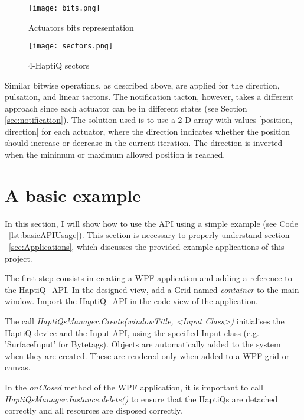 \begin{figure}[H]
  \centering
  \texttt{[image: bits.png]}
  \caption{Actuators bits representation}
  \label{fig:bits}
\end{figure}

\begin{figure}[H]
  \centering
  \texttt{[image: sectors.png]}
  \caption{4-HaptiQ sectors}
  \label{fig:sectors}
\end{figure}

Similar bitwise operations, as described above, are applied for the direction, pulsation, and linear tactons. The notification tacton, however, takes a different approach since each actuator can be in different states (see Section \ref{sec:notification}). The solution used is to use a 2-D array with values [position, direction] for each actuator, where the direction indicates whether the position should increase or decrease in the current iteration. The direction is inverted when the minimum or maximum allowed position is reached.  

\section{A basic example}

In this section, I will show how to use the API using a simple example (see Code ~\ref{lst:basicAPIUsage}). This section is necessary to properly understand section ~\ref{sec:Applications}, which discusses the provided example applications of this project.

The first step consists in creating a WPF application and adding a reference to the HaptiQ\_API. In the designed view, add a Grid named \textit{container} to the main window. Import the HaptiQ\_API in the code view of the application. 

The call \textit{HaptiQsManager.Create(windowTitle, \textless Input Class\textgreater)} initialises the HaptiQ device and the Input API, using the specified Input class (e.g. 'SurfaceInput' for Bytetags). 
Objects are automatically added to the system when they are created. These are rendered only when added to a WPF grid or canvas. 

In the \textit{onClosed} method of the WPF application, it is important to call \textit{HaptiQsManager.Instance.delete()} to ensure that the HaptiQs are detached correctly and all resources are disposed correctly.

